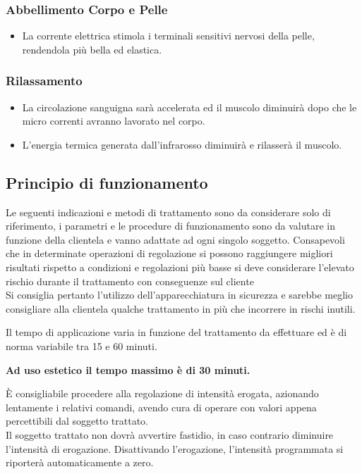 \documentclass[a4paper]{article}
\begin{document}
\subsubsection{Abbellimento Corpo e Pelle}
\begin{itemize}
  \item La corrente elettrica stimola i terminali sensitivi nervosi della pelle, rendendola più bella ed elastica.
\end{itemize}

\subsubsection{Rilassamento}
\begin{itemize}
  \item La circolazione sanguigna sarà accelerata ed il muscolo diminuirà dopo che le micro correnti avranno lavorato nel corpo.
  \item L'energia termica generata dall'infrarosso diminuirà e rilasserà il muscolo.
\end{itemize}

\subsection{Principio di funzionamento}
Le seguenti indicazioni e metodi di trattamento sono da considerare solo di riferimento, i parametri e le procedure di funzionamento sono da valutare in funzione della clientela e vanno adattate ad ogni singolo soggetto. Consapevoli che in determinate operazioni di regolazione si possono raggiungere migliori risultati rispetto a condizioni e regolazioni più basse si deve considerare l'elevato rischio durante il trattamento con conseguenze sul cliente\\
Si consiglia pertanto l'utilizzo dell'apparecchiatura in sicurezza e sarebbe meglio consigliare alla clientela qualche trattamento in più che incorrere in rischi inutili.

\vspace{10pt}
Il tempo di applicazione varia in funzione del trattamento da effettuare ed è di norma variabile tra 15 e 60 minuti.

\vspace{10pt}
\noindent \textbf{Ad uso estetico il tempo massimo è di 30 minuti.}

\vspace{10pt}
È consigliabile procedere alla regolazione di intensità erogata, azionando lentamente i relativi comandi, avendo cura di operare con valori appena percettibili dal soggetto trattato.\\
Il soggetto trattato non dovrà avvertire fastidio, in caso contrario diminuire l'intensità di erogazione. Disattivando l'erogazione, l'intensità programmata si riporterà automaticamente a zero.
\end{document}
